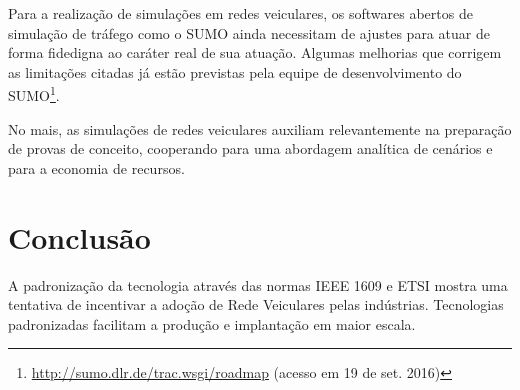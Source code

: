 \documentclass[
12pt,				%
openright,			%
oneside,			%
a4paper,			%
brazil,				%
]{abntex2}
\begin{document}
	\par Para a realização de simulações em redes veiculares, os softwares abertos de simulação de tráfego como o SUMO ainda necessitam de ajustes para atuar de forma fidedigna ao caráter real de sua atuação. Algumas melhorias que corrigem as limitações citadas já estão previstas pela equipe de desenvolvimento do SUMO{\footnote{\href{http://sumo.dlr.de/trac.wsgi/roadmap}{http://sumo.dlr.de/trac.wsgi/roadmap} (acesso em 19 de set. 2016)}}.
		
	\par No mais, as simulações de redes veiculares auxiliam relevantemente na preparação de provas de conceito, cooperando para uma abordagem analítica de cenários e para a economia de recursos.
	


	\chapter[Conclusão]{Conclusão}

	\par A padronização da tecnologia através das normas IEEE 1609 e ETSI mostra uma tentativa de incentivar a adoção de Rede Veiculares pelas indústrias. Tecnologias padronizadas facilitam a produção e implantação em maior escala.
\end{document}
